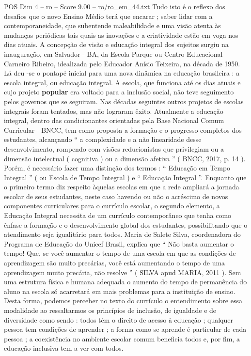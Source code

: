 \begin{textsample}{POS Dim 4 – ro – Score 9.00 – ro/ro\_em\_44.txt}
Tudo isto é o reflexo dos desafios que o novo Ensino Médio terá que encarar ; saber lidar com a contemporaneidade, que subentende maleabilidade e uma visão atenta às mudanças periódicas tais quais as inovações e a criatividade estão em voga nos dias atuais.
A concepção de visão e educação integral dos sujeitos surgiu na inauguração, em Salvador - BA, da Escola Parque ou Centro Educacional Carneiro Ribeiro, idealizada pelo Educador Anísio Teixeira, na década de 1950.
Lá deu -se o pontapé inicial para uma nova dinâmica na educação brasileira : a escola integral, ou educação integral.
A escola, que funciona até os dias atuais e cujo projeto \textbf{popular} era voltado para a inclusão social, não teve seguimento pelos governos que se seguiram.
Nas décadas seguintes outros projetos de escolas integrais foram tentados, mas não lograram êxito.
Atualmente a educação integral, dentro das condicionantes orientadas pela Base Nacional Comum Curricular - BNCC, tem como proposta a formação e o progresso completos dos estudantes, alcançando “ a complexidade e a não linearidade desse desenvolvimento, rompendo com visões reducionistas que privilegiam ou a dimensão intelectual ( cognitiva ) ou a dimensão afetiva ” ( BNCC, 2017, p. 14 ).
Porém, é necessário fazer uma distinção dos termos : “ Educação em Tempo Integral ” ( ou Escola de Tempo Integral ) e “ Educação Integral ”.
Enquanto que o primeiro termo diz respeito àquelas escolas em que a rede ampliará a jornada escolar de seus estudantes, neste caso havendo ou não o acréscimo de novos componentes curriculares para o currículo escolar, o segundo elemento, a Educação Integral necessita de um currículo contemporâneo que tenha como ênfase a formação e o desenvolvimento global dos estudantes, possibilitando que o atendimento seja igualitário para todos.
Maria de Salete Silva, coordenadora do Programa de Educação do Unicef Brasil, explica que “ Não basta aumentar o tempo!
Que, se você aumentar o tempo de uma escola em que as condições de aprendizagem são muito precárias, você está aumentando o tempo de uma aprendizagem muito precária, não resolve ” ( SILVA apud MARIA, 2011 ).
Sem uma estrutura física e humana adequada o aumento do tempo de permanência do aluno na escola só acarretará em mais problemas para a instituição de ensino.
Desta forma, podemos perceber no texto do currículo o entendimento sobre essa modalidade ao ressaltarmos os princípios de inclusão, de igualdade e de diversidade como sendo : todos têm o direito de acesso à educação ; qualquer pessoa tem condições de aprender ; a forma como se aprende é particular de cada pessoa ; a coexistência no ambiente escolar comum beneficia todos e, por fim, a educação inclusiva tem a ver com todos.

\end{textsample}
